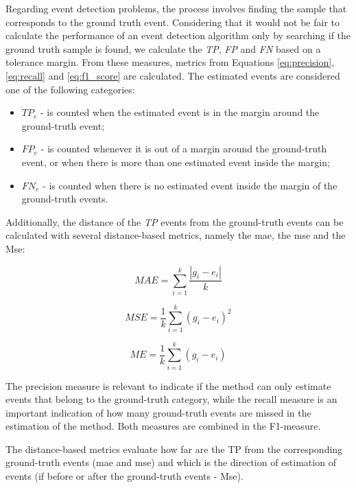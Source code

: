 Regarding event detection problems, the process involves finding the sample that corresponds to the ground truth event. Considering that it would not be fair to calculate the performance of an event detection algorithm only by searching if the ground truth sample is found, we calculate the \textit{TP}, \textit{FP} and \textit{FN} based on a tolerance margin. From these measures, metrics from Equations \ref{eq:precision}, \ref{eq:recall} and \ref{eq:f1_score} are calculated. The estimated events are considered one of the following categories:

\begin{itemize}
    \item $TP_e$ - is counted when the estimated event is in the margin around the ground-truth event;
    
    \item $FP_e$ - is counted whenever it is out of a margin around the ground-truth event, or when there is more than one estimated event inside the margin;
    
    \item $FN_e$ - is counted when there is no estimated event inside the margin of the ground-truth events.
    
\end{itemize}

Additionally, the distance of the \textit{TP} events from the ground-truth events can be calculated with several distance-based metrics, namely the \gls{mae}, the \gls{mse} and the \gls{Mse}:

\begin{equation}
    MAE = \sum^{k}_{i=1} \frac{|g_{i} - e_{i}|}{k}
\end{equation}

\begin{equation}
    MSE = \frac{1}{k} \sum^{k}_{i=1} (g_{i} - e_{i})^2
\end{equation}

\begin{equation}
    ME = \frac{1}{k} \sum^{k}_{i=1} (g_{i} - e_{i})
\end{equation}

The precision measure is relevant to indicate if the method can only estimate events that belong to the ground-truth category, while the recall measure is an important indication of how many ground-truth events are missed in the estimation of the method. Both measures are combined in the F1-measure.
\par
The distance-based metrics evaluate how far are the TP from the corresponding ground-truth events (\gls{mae} and \gls{mse}) and which is the direction of estimation of events (if before or after the ground-truth events - \gls{Mse}).

